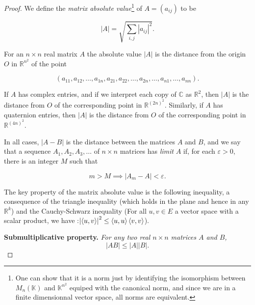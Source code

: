 \documentclass[11pt,a4paper]{article}
\theoremstyle{definition}
\numberwithin{equation}{section}
\begin{document}
\begin{proof}
    We define the \textit{matrix absolute value}\footnote{One can show that it is a norm just by identifying the isomorphism between $M_n(\mathbb{K})$ and $\mathbb{K}^{n^2}$ equiped with the canonical norm, and since we are in a finite dimensionnal vector space, all norms are equivalent.} of \( A = (a_{ij}) \) to be

\begin{equation*}
|A| = \sqrt{\sum_{i,j} |a_{ij}|^2}.
\end{equation*}

For an \( n \times n \) real matrix \( A \) the absolute value \( |A| \) is the distance from the origin \( O \) in \( \mathbb{R}^{n^2} \) of the point

\begin{equation*}
(a_{11}, a_{12}, \dots, a_{1n}, a_{21}, a_{22}, \dots, a_{2n}, \dots, a_{n1}, \dots, a_{nn}).
\end{equation*}

If \( A \) has complex entries, and if we interpret each copy of \( \mathbb{C} \) as \( \mathbb{R}^2 \), then \( |A| \) is the distance from \( O \) of the corresponding point in \( \mathbb{R}^{(2n)^2} \). Similarly, if \( A \) has quaternion entries, then \( |A| \) is the distance from \( O \) of the corresponding point in \( \mathbb{R}^{(4n)^2} \).

In all cases, \( |A - B| \) is the distance between the matrices \( A \) and \( B \), and we say that a sequence \( A_1, A_2, A_3, \dots \) of \( n \times n \) matrices has \textit{limit} \( A \) if, for each \( \varepsilon > 0 \), there is an integer \( M \) such that

\begin{equation*}
m > M \implies |A_m - A| < \varepsilon.
\end{equation*}

The key property of the matrix absolute value is the following inequality, a consequence of the triangle inequality (which holds in the plane and hence in any \( \mathbb{R}^k \)) and the  Cauchy-Schwarz inequality (For all $u,v \in E$ a vector space with a scalar product, we have :$\abs{\expval{u,v}}^2 \leq \expval{u,u}\expval{v,v}$).

\textbf{Submultiplicative property.} \textit{For any two real \( n \times n \) matrices \( A \) and \( B \),}
\begin{equation*}
|AB| \leq |A||B|.
\end{equation*}


\end{proof}
\end{document}
